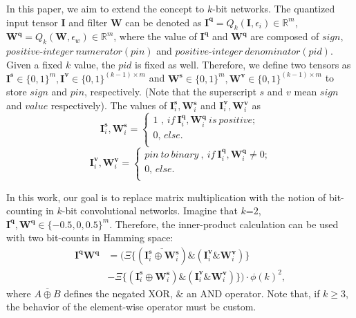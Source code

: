 \documentclass[twoside,twocolumn]{article}
\begin{document}
In this paper, we aim to extend the concept to $k$-bit networks. The quantized input tensor $\mathbf{I}$ and filter $\mathbf{W}$ can be denoted as $\mathbf{I^q}=Q_{k}(\mathbf{I},\epsilon_i) \in \mathbb{R}^m$, $\mathbf{W^q}=Q_{k}(\mathbf{W},\epsilon_w) \in \mathbb{R}^m$, where the value of $\mathbf{I^q}$ and $\mathbf{W^q}$ are composed of $sign$, $positive$-$integer\ numerator(pin)$ and $positive$-$integer\ denominator(pid)$. Given a fixed $k$ value, the $pid$ is fixed as well. Therefore, we define two tensors as $\mathbf{I^s} \in \{0,1\}^m,\mathbf{I^v} \in \{0,1\}^{(k-1)\times m}$ and $\mathbf{W^s} \in \{0,1\}^m,\mathbf{W^v} \in \{0,1\}^{(k-1)\times m}$ to store $sign$ and $pin$, respectively. (Note that the superscript $s$ and $v$ mean $sign$ and $value$ respectively).
The values of $\boldsymbol{I}_{i}^{\boldsymbol{s}},\boldsymbol{W}_{i}^{\boldsymbol{s}}$ and $\boldsymbol{I}_{i}^{\boldsymbol{v}},\boldsymbol{W}_{i}^{\boldsymbol{v}}$ as
$$
\boldsymbol{I}_{i}^{\boldsymbol{s}},\boldsymbol{W}_{i}^{\boldsymbol{s}}=\begin{cases}
	\text{1\ ,\ }if\ \boldsymbol{I}_{i}^{\boldsymbol{q}},\boldsymbol{W}_{i}^{\boldsymbol{q}}\ is\ positive;\\
	\text{0,\ }else.\\
\end{cases}
$$
$$
\boldsymbol{I}_{i}^{\boldsymbol{v}},\boldsymbol{W}_{i}^{\boldsymbol{v}}=\begin{cases}
	pin\ to\ binary\ ,\ if\ \boldsymbol{I}_{i}^{\boldsymbol{q}},\boldsymbol{W}_{i}^{\boldsymbol{q}}\ne \text{0;}\\
	\text{0,\ }else.\\
\end{cases}
$$

In this work, our goal is to replace matrix multiplication with the notion of bit-counting in $k$-bit convolutional networks. Imagine that $k$=$2$, $\mathbf{I^q},\mathbf{W^q} \in \{-0.5,0,0.5\}^m$. Therefore, the inner-product calculation can be used with two bit-counts in Hamming space:
\begin{equation}\label{eq:our_Hamming_space}
\begin{aligned}
\boldsymbol{I}^{\boldsymbol{q}}\boldsymbol{W}^{\boldsymbol{q}}&=(\varXi \{\left( \overline{\boldsymbol{I}_{i}^{\boldsymbol{s}}\oplus \boldsymbol{W}_{i}^{\boldsymbol{s}}} \right) \&\left( \boldsymbol{I}_{i}^{\boldsymbol{v}}\&\boldsymbol{W}_{i}^{\boldsymbol{v}} \right)\}\\
&-\varXi \{\left( \boldsymbol{I}_{i}^{\boldsymbol{s}}\oplus \boldsymbol{W}_{i}^{\boldsymbol{s}} \right) \&\left( \boldsymbol{I}_{i}^{\boldsymbol{v}}\&\boldsymbol{W}_{i}^{\boldsymbol{v}} \right)\}) \cdot \phi(k)^2,
\end{aligned}
\end{equation}
where $\overline{A\oplus B}$ defines the negated XOR, $\&$ an AND operator.
Note that, if $k\geqslant3$, the behavior of the element-wise operator must be custom.
\end{document}
